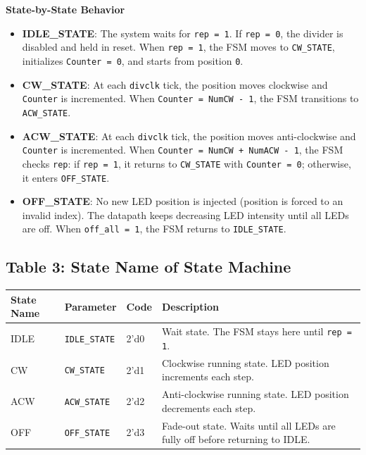 \noindent\textbf{State-by-State Behavior}
\begin{itemize}
	\item \textbf{IDLE\_STATE}: The system waits for \texttt{rep = 1}. If \texttt{rep = 0}, the divider is disabled and held in reset. When \texttt{rep = 1}, the FSM moves to \texttt{CW\_STATE}, initializes \texttt{Counter = 0}, and starts from position \texttt{0}.

	\item \textbf{CW\_STATE}: At each \texttt{divclk} tick, the position moves clockwise and \texttt{Counter} is incremented. When \texttt{Counter = NumCW - 1}, the FSM transitions to \texttt{ACW\_STATE}.

	\item \textbf{ACW\_STATE}: At each \texttt{divclk} tick, the position moves anti-clockwise and \texttt{Counter} is incremented. When \texttt{Counter = NumCW + NumACW - 1}, the FSM checks \texttt{rep}: if \texttt{rep = 1}, it returns to \texttt{CW\_STATE} with \texttt{Counter = 0}; otherwise, it enters \texttt{OFF\_STATE}.

	\item \textbf{OFF\_STATE}: No new LED position is injected (position is forced to an invalid index). The datapath keeps decreasing LED intensity until all LEDs are off. When \texttt{off\_all = 1}, the FSM returns to \texttt{IDLE\_STATE}.
\end{itemize}

\subsection*{Table 3: State Name of State Machine}
\renewcommand{\arraystretch}{1.2}
\begin{tabular}{lll p{8cm}}
\toprule
\textbf{State Name} & \textbf{Parameter} & \textbf{Code} & \textbf{Description} \\
\midrule
IDLE & \texttt{IDLE\_STATE} & 2'd0 & Wait state. The FSM stays here until \texttt{rep = 1}. \\
CW & \texttt{CW\_STATE} & 2'd1 & Clockwise running state. LED position increments each step. \\
ACW & \texttt{ACW\_STATE} & 2'd2 & Anti-clockwise running state. LED position decrements each step. \\
OFF & \texttt{OFF\_STATE} & 2'd3 & Fade-out state. Waits until all LEDs are fully off before returning to IDLE. \\
\bottomrule
\end{tabular}
